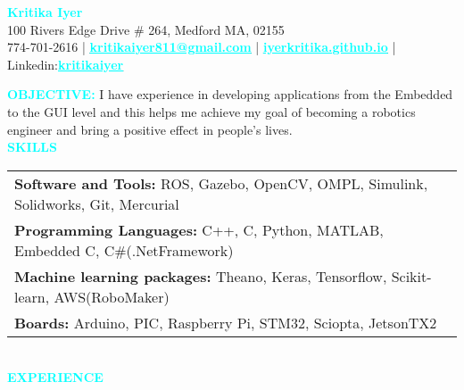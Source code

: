 \documentclass[10.9pt,letter]{article}
\newcommand{\aquaText}[1]{\textcolor{aqua}{\textbf{#1}}}
\newcommand{\para}{\\[.5\baselineskip]}
\begin{document}
\begin{center}
    \Large\aquaText{Kritika Iyer}\\
    \large 100 Rivers Edge Drive \# 264, Medford MA, 02155\\
    774-701-2616 | \href{mailto:kritikaiyer811@gmail.com}{\aquaText{\underline{kritikaiyer811@gmail.com}}} | \href{iyerkritika.github.io}{\aquaText{\underline{iyerkritika.github.io}}} | Linkedin:\href{https://www.linkedin.com/in/kritikaiyer/}{{\aquaText{\underline{kritikaiyer}}}}\\
\end{center}
\aquaText{OBJECTIVE:} \normalsize I have experience in developing applications from the Embedded to the GUI level and this helps me achieve my goal of becoming a robotics engineer and bring a positive effect in people's lives.\para
\aquaText{SKILLS}\para 
\begin{tabular}{p{}}
    \textbf{Software and Tools:} ROS, Gazebo, OpenCV, OMPL, Simulink, Solidworks, Git, Mercurial\\
    \textbf{Programming Languages:} C++, C, Python, MATLAB, Embedded C, C\#(.NetFramework)\\
    \textbf{Machine learning packages:} Theano, Keras, Tensorflow, Scikit-learn, AWS(RoboMaker)\\
    \textbf{Boards:} Arduino, PIC, Raspberry Pi, STM32, Sciopta, JetsonTX2\\
\end{tabular}\para
\aquaText{EXPERIENCE}\para
\end{document}

